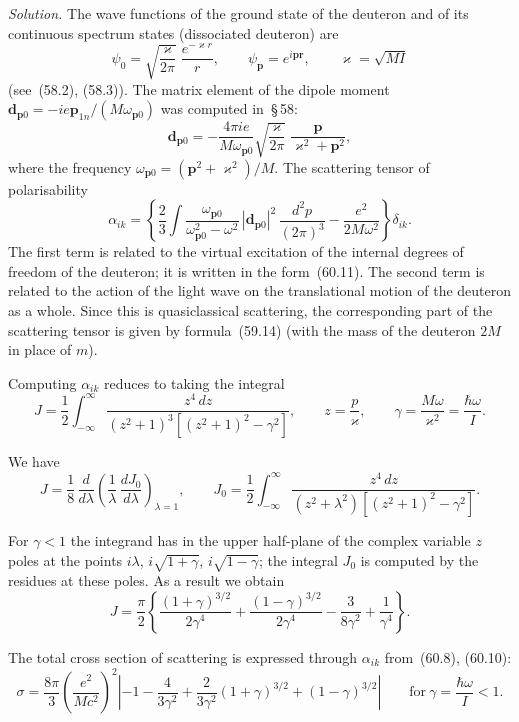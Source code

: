 \textit{Solution.} The wave functions of the ground state of the deuteron and of its continuous spectrum states (dissociated deuteron) are
\[
\psi_0 = \sqrt{\frac{\varkappa}{2\pi}}\;\frac{e^{-\varkappa r}}{r},\qquad \psi_\mathbf{p} = e^{i\mathbf{p}\mathbf{r}},\qquad \varkappa = \sqrt{MI}
\]
(see~(58.2), (58.3)). The matrix element of the dipole moment $\mathbf{d}_{\mathbf{p}0} = -ie\mathbf{p}_{1n}/(M\omega_{\mathbf{p}0})$ was computed in~\S\,58:
\[
\mathbf{d}_{\mathbf{p}0} = -\frac{4\pi ie}{M\omega_{\mathbf{p}0}}\sqrt{\frac{\varkappa}{2\pi}}\;\frac{\mathbf{p}}{\varkappa^2 + \mathbf{p}^2},
\]
where the frequency $\omega_{\mathbf{p}0} = (\mathbf{p}^2 + \varkappa^2)/M$. The scattering tensor of polarisability
\[
\alpha_{ik} = \left\{\frac{2}{3}\int\frac{\omega_{\mathbf{p}0}}{\omega^2_{\mathbf{p}0} - \omega^2}\,|\mathbf{d}_{\mathbf{p}0}|^2\,\frac{d^2p}{(2\pi)^3} - \frac{e^2}{2M\omega^2}\right\}\delta_{ik}.
\]
The first term is related to the virtual excitation of the internal degrees of freedom of the deuteron; it is written in the form~(60.11). The second term is related to the action of the light wave on the translational motion of the deuteron as a whole. Since this is quasiclassical scattering, the corresponding part of the scattering tensor is given by formula~(59.14) (with the mass of the deuteron $2M$ in place of $m$).

Computing $\alpha_{ik}$ reduces to taking the integral
\[
J = \frac{1}{2}\int_{-\infty}^{\infty}\frac{z^4\,dz}{(z^2+1)^3[(z^2+1)^2 - \gamma^2]},\qquad z = \frac{p}{\varkappa},\qquad \gamma = \frac{M\omega}{\varkappa^2} = \frac{\hbar\omega}{I}.
\]

We have
\[
J = \frac{1}{8}\,\frac{d}{d\lambda}\!\left(\frac{1}{\lambda}\,\frac{dJ_0}{d\lambda}\right)_{\!\lambda=1},\qquad J_0 = \frac{1}{2}\int_{-\infty}^{\infty}\frac{z^4\,dz}{(z^2 + \lambda^2)[(z^2+1)^2 - \gamma^2]}.
\]

For $\gamma < 1$ the integrand has in the upper half-plane of the complex variable $z$ poles at the points $i\lambda$, $i\sqrt{1+\gamma}$, $i\sqrt{1-\gamma}$; the integral $J_0$ is computed by the residues at these poles. As a result we obtain
\[
J = \frac{\pi}{2}\left\{\frac{(1+\gamma)^{3/2}}{2\gamma^4} + \frac{(1-\gamma)^{3/2}}{2\gamma^4} - \frac{3}{8\gamma^2} + \frac{1}{\gamma^4}\right\}.
\]

The total cross section of scattering is expressed through $\alpha_{ik}$ from~(60.8), (60.10):
\[
\sigma = \frac{8\pi}{3}\left(\frac{e^2}{Mc^2}\right)^{\!2}\left|-1 - \frac{4}{3\gamma^2} + \frac{2}{3\gamma^2}(1+\gamma)^{3/2} + (1-\gamma)^{3/2}\right|\qquad\text{for}\ \gamma = \frac{\hbar\omega}{I} < 1.
\]

